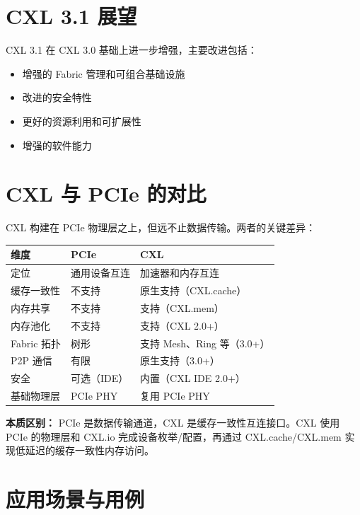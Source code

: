 \documentclass[12pt,a4paper]{article}
\begin{document}
\section{CXL 3.1 展望}

CXL 3.1 在 CXL 3.0 基础上进一步增强，主要改进包括：
\begin{itemize}
    \item 增强的 Fabric 管理和可组合基础设施
    \item 改进的安全特性
    \item 更好的资源利用和可扩展性
    \item 增强的软件能力
\end{itemize}

\section{CXL 与 PCIe 的对比}

\begin{analysisbox}
CXL 构建在 PCIe 物理层之上，但远不止数据传输。两者的关键差异：

\begin{tabularx}{\textwidth}{@{}lXX@{}}
\toprule
\textbf{维度} & \textbf{PCIe} & \textbf{CXL} \\
\midrule
定位 & 通用设备互连 & 加速器和内存互连 \\
缓存一致性 & 不支持 & 原生支持（CXL.cache） \\
内存共享 & 不支持 & 支持（CXL.mem） \\
内存池化 & 不支持 & 支持（CXL 2.0+） \\
Fabric 拓扑 & 树形 & 支持 Mesh、Ring 等（3.0+） \\
P2P 通信 & 有限 & 原生支持（3.0+） \\
安全 & 可选（IDE） & 内置（CXL IDE 2.0+） \\
基础物理层 & PCIe PHY & 复用 PCIe PHY \\
\bottomrule
\end{tabularx}

\textbf{本质区别：} PCIe 是数据传输通道，CXL 是缓存一致性互连接口。CXL 使用 PCIe 的物理层和 CXL.io 完成设备枚举/配置，再通过 CXL.cache/CXL.mem 实现低延迟的缓存一致性内存访问。
\end{analysisbox}

\section{应用场景与用例}
\end{document}
